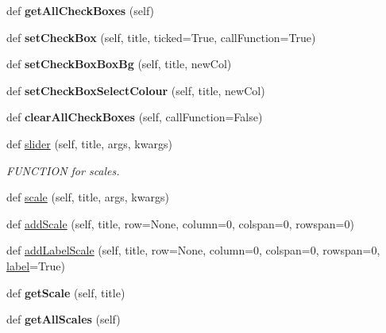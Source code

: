 \begin{DoxyCompactItemize}
def {\bfseries get\+All\+Check\+Boxes} (self)
\item 
\mbox{\label{classappjar_1_1gui_a4af955974473127c2bec7749b1c123c3}} 
def {\bfseries set\+Check\+Box} (self, title, ticked=True, call\+Function=True)
\item 
\mbox{\label{classappjar_1_1gui_ad837cf50888ceb8084534652ddf09073}} 
def {\bfseries set\+Check\+Box\+Box\+Bg} (self, title, new\+Col)
\item 
\mbox{\label{classappjar_1_1gui_a6d32eee0af31a5eb7f0888d1e6c5b2df}} 
def {\bfseries set\+Check\+Box\+Select\+Colour} (self, title, new\+Col)
\item 
\mbox{\label{classappjar_1_1gui_a0c623b1bd8e0967ebcad12099c62373a}} 
def {\bfseries clear\+All\+Check\+Boxes} (self, call\+Function=False)
\item 
def \hyperlink{classappjar_1_1gui_aea5794cdc78c322ec39b169c7e823347}{slider} (self, title, args, kwargs)
\begin{DoxyCompactList}\small\item\em F\+U\+N\+C\+T\+I\+ON for scales. \end{DoxyCompactList}\item 
def \hyperlink{classappjar_1_1gui_ab35721225a586baa2f80286c640e660e}{scale} (self, title, args, kwargs)
\item 
def \hyperlink{classappjar_1_1gui_a7344e7c1defc95790756b23b9ad9b7bb}{add\+Scale} (self, title, row=None, column=0, colspan=0, rowspan=0)
\item 
def \hyperlink{classappjar_1_1gui_a7c14eb8e24cb016be967441d45e8c4bc}{add\+Label\+Scale} (self, title, row=None, column=0, colspan=0, rowspan=0, \hyperlink{classappjar_1_1gui_a161659a9096715ced2da924ab88ddecc}{label}=True)
\item 
\mbox{\label{classappjar_1_1gui_ac593d1a4e8f82b11580a9363a1e71d04}} 
def {\bfseries get\+Scale} (self, title)
\item 
\mbox{\label{classappjar_1_1gui_a3c6eecb1ddddd171248b0bc52e90034f}} 
def {\bfseries get\+All\+Scales} (self)
\item 
\mbox{\label{classappjar_1_1gui_a3b05367a1a35213846f8734a386323a6}} 

\end{DoxyCompactItemize}
